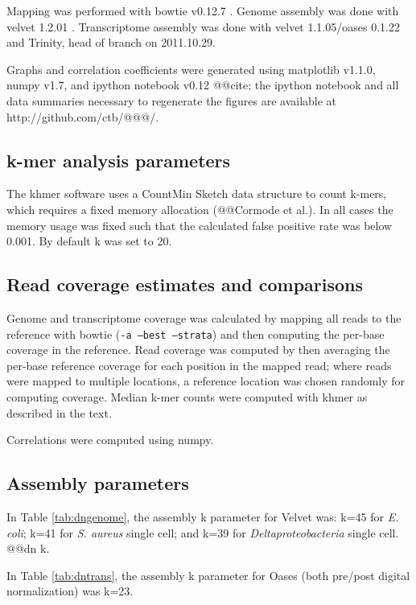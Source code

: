 \documentclass[10pt]{article}
\begin{document}
Mapping was performed with bowtie v0.12.7 \cite{pubmed19261174}.
Genome assembly was done with velvet 1.2.01 \cite{pubmed18349386}.
Transcriptome assembly was done with velvet 1.1.05/oases 0.1.22 and
Trinity, head of branch on 2011.10.29.

Graphs and correlation coefficients were generated using matplotlib
v1.1.0, numpy v1.7, and ipython notebook v0.12 @@cite; the ipython
notebook and all data summaries necessary to regenerate the figures
are available at http://github.com/ctb/@@@/.

\subsection*{k-mer analysis parameters}

The khmer software uses a CountMin Sketch data structure to count k-mers,
which requires a fixed memory allocation (@@Cormode et al.).  In all cases
the memory usage was fixed such that the calculated false positive rate was
below 0.001.  By default k was set to 20.

\subsection*{Read coverage estimates and comparisons}

Genome and transcriptome coverage was calculated by mapping all reads
to the reference with bowtie ({\tt -a --best --strata}) and then
computing the per-base coverage in the reference.  Read coverage was
computed by then averaging the per-base reference coverage for each
position in the mapped read; where reads were mapped to multiple
locations, a reference location was chosen randomly for computing
coverage.  Median k-mer counts were computed with khmer as described
in the text.

Correlations were computed using numpy.

\subsection*{Assembly parameters}

In Table \ref{tab:dngenome}, the assembly k parameter for Velvet was:
k=45 for {\em E. coli}; k=41 for {\em S. aureus} single cell; and k=39
for {\em Deltaproteobacteria} single cell.   @@dn k.  

In Table \ref{tab:dntrans}, the assembly k parameter for Oases (both
pre/post digital normalization) was k=23.
\end{document}
